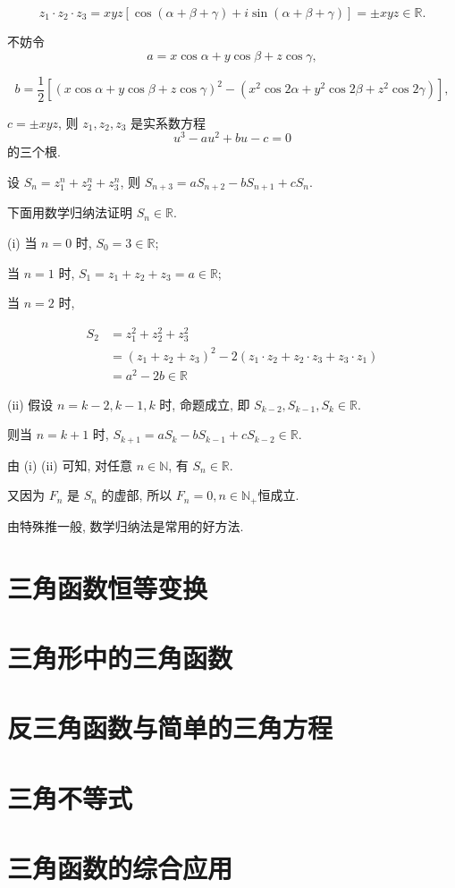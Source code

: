 \begin{solution}
	$$
		z_{1} \cdot z_{2} \cdot z_{3}=x y z[\cos (\alpha+\beta+\gamma)+i \sin (\alpha+\beta+\gamma)]= \pm x y z \in \mathbb{R}.
	$$

	不妨令
	$$
		a=x \cos \alpha+y \cos \beta+z \cos \gamma,
	$$

	$$
		b=\frac{1}{2}\left[(x \cos \alpha+y \cos \beta+z \cos \gamma)^{2}-\left(x^{2} \cos 2 \alpha+y^{2} \cos 2 \beta+z^{2} \cos 2 \gamma\right)\right],
	$$

	$c= \pm x y z$, 则 $z_{1} ,  z_{2} ,  z_{3}$ 是实系数方程
	$$
		u^{3}-a u^{2}+b u-c=0
	$$
	的三个根.

	设 $S_{n}=z_{1}^{n}+z_{2}^{n}+z_{3}^{n}$, 则 $S_{n+3}=a S_{n+2}-b S_{n+1}+c S_{n}$.

	下面用数学归纳法证明 $S_{n} \in \mathbb{R}$.

	(i) 当 $n=0$ 时, $S_{0}=3 \in \mathbb{R}$;

	当 $n=1$ 时, $S_{1}=z_{1}+z_{2}+z_{3}=a \in \mathbb{R}$;

	当 $n=2$ 时,

	$$
		\begin{aligned}
			S_{2} & =z_{1}^{2}+z_{2}^{2}+z_{3}^{2}                                                                          \\
			      & =\left(z_{1}+z_{2}+z_{3}\right)^{2}-2\left(z_{1} \cdot z_{2}+z_{2} \cdot z_{3}+z_{3} \cdot z_{1}\right) \\
			      & =a^{2}-2 b \in \mathbb{R}
		\end{aligned}
	$$

	(ii) 假设 $n=k-2, k-1, k$ 时, 命题成立, 即 $S_{k-2}, S_{k-1}, S_{k} \in \mathbb{R}$.

	则当 $n=k+1$ 时, $S_{k+1}=a S_{k}-b S_{k-1}+c S_{k-2} \in \mathbb{R}$.

	由 (i) (ii) 可知, 对任意 $n \in \mathbb{N}$, 有 $S_{n} \in \mathbb{R}$.

	又因为 $F_{n}$ 是 $S_{n}$ 的虚部, 所以 $F_{n}=0, n \in \mathbb{N}_{+}$恒成立.
\end{solution}
\begin{note}
	由特殊推一般, 数学归纳法是常用的好方法.
\end{note}


\section{三角函数恒等变换}
\section{三角形中的三角函数}
\section{反三角函数与简单的三角方程}
\section{三角不等式}
\section{三角函数的综合应用}